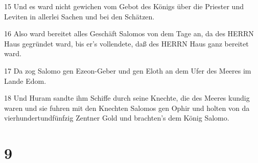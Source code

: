\par 15 Und es ward nicht gewichen vom Gebot des Königs über die Priester und Leviten in allerlei Sachen und bei den Schätzen.
\par 16 Also ward bereitet alles Geschäft Salomos von dem Tage an, da des HERRN Haus gegründet ward, bis er's vollendete, daß des HERRN Haus ganz bereitet ward.
\par 17 Da zog Salomo gen Ezeon-Geber und gen Eloth an dem Ufer des Meeres im Lande Edom.
\par 18 Und Huram sandte ihm Schiffe durch seine Knechte, die des Meeres kundig waren und sie fuhren mit den Knechten Salomos gen Ophir und holten von da vierhundertundfünfzig Zentner Gold und brachten's dem König Salomo.

\chapter{9}

